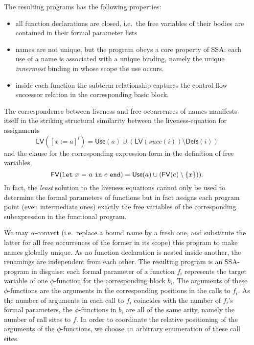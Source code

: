 The resulting programs has the following properties:
\begin{itemize}
\item all function declarations are closed, i.e.~the free variables of their bodies are contained in their formal parameter lists
\item names are not unique, but the program obeys a core property
of SSA: each use of a name is associated with a unique binding, namely
the unique \emph{innermost} binding in whose scope the use occurs.
\item inside each function the subterm relationship captures the control flow successor relation in the corresponding basic block.
\end{itemize}
The correspondence between liveness and free occurrences of names
manifests itself in the striking structural similarity between the
liveness-equation for assignments $$\mathsf{LV}([x:=a]^i) =
\mathsf{Use}(a) \cup (\mathsf{LV}(\mathit{succ}(i)) \setminus \mathsf{Defs}(i))$$ and the clause for the corresponding expression form %
in the definition of free variables,
$$\mathsf{FV}(\mathtt{let}\ {x}\ \mathtt{=}\ {a}\ \mathtt{in}\ {e}\ \mathtt{end}) = \mathsf{Use}(a) \cup (\mathsf{FV}(e) \setminus
\{x\})).$$ In fact, the
\emph{least} solution to the liveness equations cannot only be used to determine the formal parameters of functions but in fact assigns each program point (even
intermediate ones) exactly the free variables of the corresponding
subexpression in the functional program.

We may $\alpha$-convert (i.e.~replace a bound name by a fresh one, and
substitute the latter for all free occurrences of the former in its
scope) this program to make names globally unique. As no function
declaration is nested inside another, the renamings are independent
from each other.  The resulting program is an SSA-program in disguise:
each formal parameter of a function $f_i$ represents the target
variable of one $\phi$-function for the corresponding block $b_i$. The
arguments of these $\phi$-functions are the arguments in the
corresponding positions in the calls to $f_i$. As the number of
arguments in each call to $f_i$ coincides with the number of $f_i$'s
formal parameters, the $\phi$-functions in $b_i$ are all of the same
arity, namely the number of call sites to $f$. In order to coordinate
the relative positioning of the arguments of the $\phi$-functions, we
choose an arbitrary enumeration of these call sites. 

